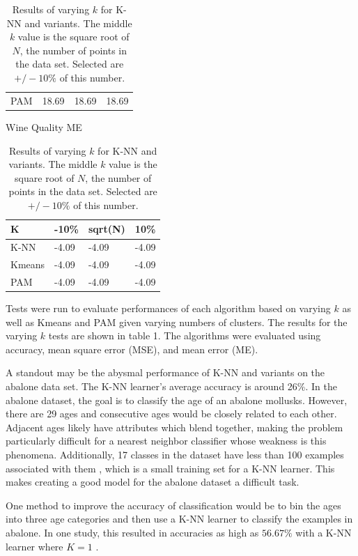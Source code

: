 \documentclass[twoside,11pt]{article}
\begin{document}
\begin{table}[ht]
\begin{minipage}[b]{0.45\linewidth}
\begin{tabular}{llll}
			PAM    & 18.69 & 18.69   & 18.69
		\end{tabular}
	\end{minipage}
	\hspace{0.5cm}\centering
	\centering
	\begin{minipage}[b]{0.45\linewidth}
		Wine Quality ME
		\centering
		\begin{tabular}{llll}
			\hline
			K      & -10\% & sqrt(N) & 10\%  \\ \hline
			K-NN   & -4.09 & -4.09   & -4.09 \\
			Kmeans & -4.09 & -4.09   & -4.09 \\
			PAM    & -4.09 & -4.09   & -4.09
		\end{tabular}
	\end{minipage}
	\caption{Results of varying $k$ for K-NN and variants. The middle $k$ value is the square root of $N$, the number of points in the data set. Selected are $+/- 10\%$ of this number.}
\end{table}

Tests were run to evaluate performances of each algorithm based on varying $k$ as well as Kmeans and PAM given varying numbers of clusters. The results for the varying $k$ tests are shown in table 1. The algorithms were evaluated using accuracy, mean square error (MSE), and mean error (ME).

A standout may be the abysmal performance of K-NN and variants on the abalone data set. The K-NN learner's average accuracy is around 26\%. In the abalone dataset, the goal is to classify the age of an abalone mollusks. However, there are 29 ages and consecutive ages would be closely related to each other. Adjacent ages likely have attributes which blend together, making the problem particularly difficult for a nearest neighbor classifier whose weakness is this phenomena. 
Additionally, 17 classes in the dataset have less than 100 examples associated with them \citep{datasets}, which is a small training set for a K-NN learner.
This makes creating a good model for the abalone dataset a difficult task.

One method to improve the accuracy of classification would be to bin the ages into three age categories and then use a K-NN learner to classify the examples in abalone. In one study, this resulted in accuracies as high as $56.67\%$ with a K-NN learner where $K = 1$ \citep{abalone-bad}.
\end{document}

